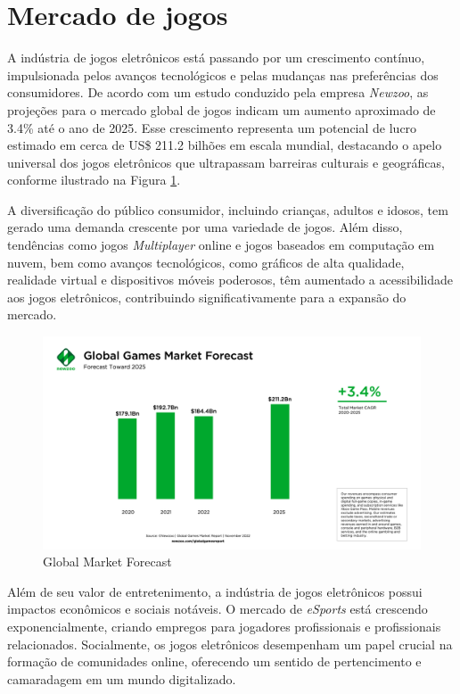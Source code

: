\section{Mercado de jogos}

A indústria de jogos eletrônicos está passando por um crescimento contínuo, impulsionada pelos avanços tecnológicos e pelas mudanças nas preferências dos consumidores. De acordo com um estudo conduzido pela empresa \textit{\gls{Newzoo}}, as projeções para o mercado global de jogos indicam um aumento aproximado de 3.4\% até o ano de 2025. Esse crescimento representa um potencial de lucro estimado em cerca de US\$ 211.2 bilhões em escala mundial, destacando o apelo universal dos jogos eletrônicos que ultrapassam barreiras culturais e geográficas, conforme ilustrado na Figura \ref{GlobalMarketForecast}.

A diversificação do público consumidor, incluindo crianças, adultos e idosos, tem gerado uma demanda crescente por uma variedade de jogos. Além disso, tendências como jogos \textit{\gls{Multiplayer}} online e jogos baseados em computação em nuvem, bem como avanços tecnológicos, como gráficos de alta qualidade, realidade virtual e dispositivos móveis poderosos, têm aumentado a acessibilidade aos jogos eletrônicos, contribuindo significativamente para a expansão do mercado.

\begin{figure}[H]
	\centering
	\includegraphics[scale=0.24]{imagens/revisaoLeitura/global_games_market_forecast.png}
	\caption{Global Market Forecast}
	\label{GlobalMarketForecast}
\end{figure}

Além de seu valor de entretenimento, a indústria de jogos eletrônicos possui impactos econômicos e sociais notáveis. O mercado de \textit{eSports} está crescendo exponencialmente, criando empregos para jogadores profissionais e profissionais relacionados. Socialmente, os jogos eletrônicos desempenham um papel crucial na formação de comunidades online, oferecendo um sentido de pertencimento e camaradagem em um mundo digitalizado.

